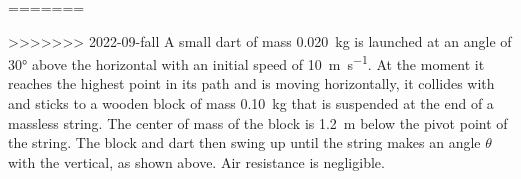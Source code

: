 \documentclass{../../oss-apphys-exam}
\newcounter{lastmc}
\begin{document}
  \begin{questions}    
=======
\begin{questions}
  \setcounter{question}{\value{lastmc}}
  
>>>>>>> 2022-09-fall
  \question A small dart of mass \SI{.020}{\kilo\gram} is launched at an angle
  of \ang{30} above the horizontal with an initial speed of
  \SI{10}{\meter\per\second}. At the moment it reaches the highest point in its
  path and is moving horizontally, it collides with and sticks to a wooden
  block of mass \SI{.10}{\kilo\gram} that is suspended at the end of a massless
  string. The center of mass of the block is \SI{1.2}{\metre} below the pivot
  point of the string. The block and dart then swing up until the string makes
  an angle $\theta$ with the vertical, as shown above. Air resistance is
  negligible.
\end{questions}
\end{questions}
\end{document}
